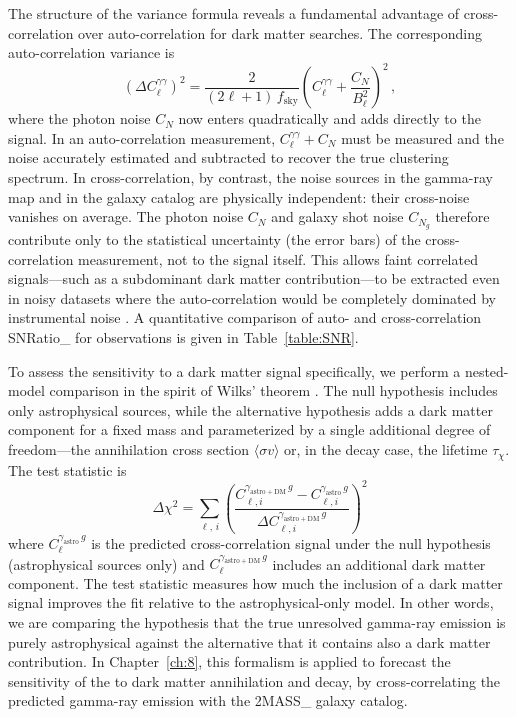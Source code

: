 The structure of the variance formula reveals a fundamental advantage of cross-correlation over auto-correlation for dark matter searches.
The corresponding auto-correlation variance is \cite{Fornengo:2013rga}
\begin{equation}
	(\Delta C_\ell^{\gamma\gamma})^2 = \frac{2}{(2\ell+1)\, f_\mathrm{sky}} \left(C_\ell^{\gamma\gamma} + \frac{C_N}{B_\ell^2}\right)^2\,,
	\label{eq:variance_auto}
\end{equation}
where the photon noise $C_N$ now enters quadratically and adds directly to the signal.
In an auto-correlation measurement, $C_\ell^{\gamma\gamma} + C_N$ must be measured and the noise accurately estimated and subtracted to recover the true clustering spectrum.
In cross-correlation, by contrast, the noise sources in the gamma-ray map and in the galaxy catalog are physically independent: their cross-noise vanishes on average.
The photon noise $C_N$ and galaxy shot noise $C_{N_g}$ therefore contribute only to the statistical uncertainty (the error bars) of the cross-correlation measurement, not to the signal itself.
This allows faint correlated signals---such as a subdominant dark matter contribution---to be extracted even in noisy datasets where the auto-correlation would be completely dominated by instrumental noise \cite{Fornengo:2013rga,Camera:2012cj}. A quantitative comparison of auto- and cross-correlation \gls{SNRatio_} for \CTAO observations is given in Table~\ref{table:SNR}.

To assess the sensitivity to a dark matter signal specifically, we perform a nested-model comparison in the spirit of Wilks' theorem \cite{Fornengo:2013rga}.
The null hypothesis includes only astrophysical sources, while the alternative hypothesis adds a dark matter component for a fixed mass and parameterized by a single additional degree of freedom---the annihilation cross section $\langle \sigma v \rangle$ or, in the decay case, the lifetime $\tau_\chi$.
The test statistic is
\begin{equation}
	\Delta\chi^2 = \sum_{\ell,\, i} \left(\frac{C_{\ell,i}^{\gamma_\mathrm{astro+DM}\, g} - C_{\ell,i}^{\gamma_\mathrm{astro}\, g}}{\Delta C_{\ell,i}^{\gamma_\mathrm{astro+DM}\, g}}\right)^2
	\label{eq:delta_chi2}
\end{equation}
where $C_{\ell}^{\gamma_\mathrm{astro}\, g}$ is the predicted cross-correlation signal under the null hypothesis (astrophysical sources only) and $C_{\ell}^{\gamma_\mathrm{astro+DM}\, g}$ includes an additional dark matter component.
The test statistic measures how much the inclusion of a dark matter signal improves the fit relative to the astrophysical-only model. In other words, we are comparing the hypothesis that the true unresolved gamma-ray emission is purely astrophysical against the alternative that it contains also a dark matter contribution.
In Chapter~\ref{ch:8}, this formalism is applied to forecast the sensitivity of the \CTAO to dark matter annihilation and decay, by cross-correlating the predicted gamma-ray emission with the \gls{2MASS_} galaxy catalog.
